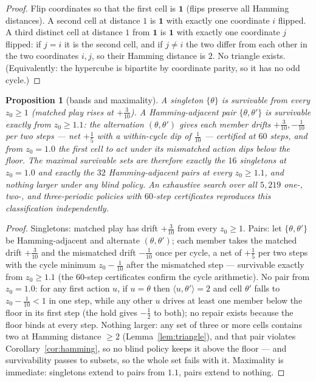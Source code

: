 \documentclass[10pt,twocolumn]{article}
\theoremstyle{plain}
\newtheorem{proposition}[theorem]{Proposition}
\theoremstyle{definition}
\theoremstyle{remark}
\begin{document}
\begin{proof}
Flip coordinates so that the first cell is \(\mathbf{1}\) (flips
preserve all Hamming distances). A second cell at distance \(1\) is
\(\mathbf{1}\) with exactly one coordinate \(i\) flipped. A third
distinct cell at distance \(1\) from \(\mathbf{1}\) is
\(\mathbf{1}\) with exactly one coordinate \(j\) flipped: if
\(j = i\) it is the second cell, and if \(j \neq i\) the two differ
from each other in the two coordinates \(i, j\), so their Hamming
distance is \(2\). No triangle exists. (Equivalently: the hypercube
is bipartite by coordinate parity, so it has no odd cycle.)
\end{proof}

\begin{proposition}[bands and maximality]\label{prop:bands}
A singleton \(\{\theta\}\) is survivable from every \(z_{0} \ge 1\)
(matched play rises at \(+\tfrac3{10}\)). A Hamming-adjacent pair
\(\{\theta, \theta'\}\) is survivable exactly from
\(z_{0} \ge 1.1\): the alternation \((\theta, \theta')\) gives each
member drifts \(+\tfrac3{10}, -\tfrac1{10}\) per two steps --- net
\(+\tfrac15\) with a within-cycle dip of \(\tfrac1{10}\) --- certified
at \(60\) steps, and from \(z_{0} = 1.0\) the first cell to act under
its mismatched action dips below the floor. The maximal survivable
sets are therefore exactly the \(16\) singletons at \(z_{0} = 1.0\)
and exactly the \(32\) Hamming-adjacent pairs at every
\(z_{0} \ge 1.1\), and nothing larger under any blind policy. An
exhaustive search over all \(5{,}219\) one-, two-, and three-periodic
policies with \(60\)-step certificates reproduces this classification
independently.
\end{proposition}

\begin{proof}
Singletons: matched play has drift \(+\tfrac3{10}\) from every
\(z_{0} \ge 1\). Pairs: let \(\{\theta, \theta'\}\) be
Hamming-adjacent and alternate \((\theta, \theta')\); each member
takes the matched drift \(+\tfrac3{10}\) and the mismatched drift
\(-\tfrac1{10}\) once per cycle, a net of \(+\tfrac15\) per two
steps with the cycle minimum \(z_{0} - \tfrac1{10}\) after the
mismatched step --- survivable exactly from \(z_{0} \ge 1.1\)
(the \(60\)-step certificates confirm the cycle arithmetic).
No pair from \(z_{0} = 1.0\): for any first action \(u\), if
\(u = \theta\) then \(\langle u, \theta'\rangle = 2\) and cell
\(\theta'\) falls to \(z_{0} - \tfrac1{10} < 1\) in one step, while
any other \(u\) drives at least one member below the floor in its
first step (the hold gives \(-\tfrac12\) to both); no repair exists
because the floor binds at every step. Nothing larger: any set of
three or more cells contains two at Hamming distance \(\ge 2\)
(Lemma~\ref{lem:triangle}), and that pair violates
Corollary~\ref{cor:hamming}, so no blind policy keeps it above the
floor --- and survivability passes to subsets, so the whole set fails
with it. Maximality is immediate: singletons extend to pairs from
\(1.1\), pairs extend to nothing.
\end{proof}
\end{document}
